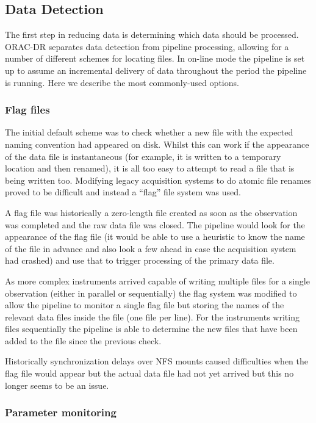 \documentclass[final,authoryear,5p,times,twocolumn]{elsarticle}
\begin{document}
\subsection{Data Detection}

The first step in reducing data is determining which data should be
processed. ORAC-DR separates data detection from pipeline processing,
allowing for a number of different schemes for locating files. In
on-line mode the pipeline is set up to assume an incremental delivery
of data throughout the period the pipeline is running. Here we
describe the most commonly-used options.

\subsubsection{Flag files}

The initial default scheme was to check whether a new file with the
expected naming convention had appeared on disk. Whilst this can work
if the appearance of the data file is instantaneous (for example, it
is written to a temporary location and then renamed), it is all too
easy to attempt to read a file that is being written too. Modifying
legacy acquisition systems to do atomic file renames proved to be
difficult and instead a ``flag'' file system was used.

A flag file was historically a zero-length file created as soon as the
observation was completed and the raw data file was closed. The
pipeline would look for the appearance of the flag file (it would be
able to use a heuristic to know the name of the file in advance and
also look a few ahead in case the acquisition system had crashed) and
use that to trigger processing of the primary data file.

As more complex instruments arrived capable of writing multiple files
for a single observation (either in parallel or sequentially)
\citep{2009MNRAS.399.1026B,2013MNRAS.430.2513H} the flag system was
modified to allow the pipeline to monitor a single flag file but
storing the names of the relevant data files inside the file (one file
per line). For the instruments writing files sequentially the pipeline
is able to determine the new files that have been added to the file
since the previous check.

Historically synchronization delays over NFS mounts caused
difficulties when the flag file would appear but the actual data file
had not yet arrived but this no longer seems to be an issue.

\subsubsection{Parameter monitoring}
\end{document}
